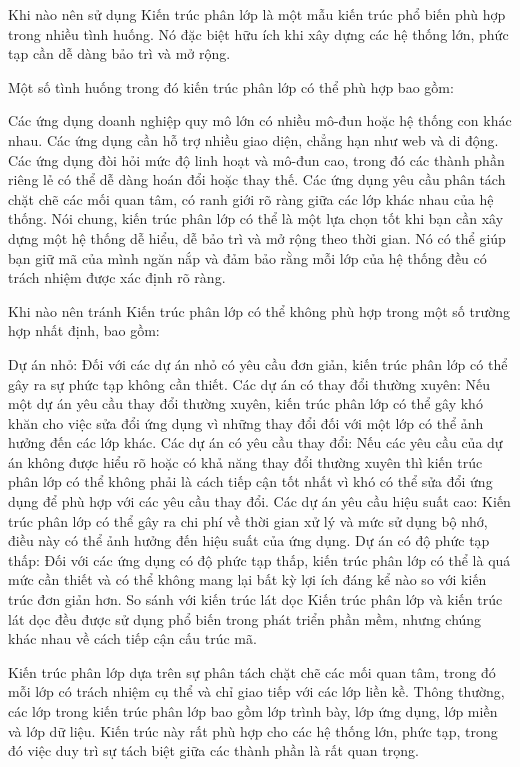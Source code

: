 Khi nào nên sử dụng
Kiến trúc phân lớp là một mẫu kiến ​​trúc phổ biến phù hợp trong nhiều tình huống. Nó đặc biệt hữu ích khi xây dựng các hệ thống lớn, phức tạp cần dễ dàng bảo trì và mở rộng.

Một số tình huống trong đó kiến ​​trúc phân lớp có thể phù hợp bao gồm:

Các ứng dụng doanh nghiệp quy mô lớn có nhiều mô-đun hoặc hệ thống con khác nhau.
Các ứng dụng cần hỗ trợ nhiều giao diện, chẳng hạn như web và di động.
Các ứng dụng đòi hỏi mức độ linh hoạt và mô-đun cao, trong đó các thành phần riêng lẻ có thể dễ dàng hoán đổi hoặc thay thế.
Các ứng dụng yêu cầu phân tách chặt chẽ các mối quan tâm, có ranh giới rõ ràng giữa các lớp khác nhau của hệ thống.
Nói chung, kiến ​​trúc phân lớp có thể là một lựa chọn tốt khi bạn cần xây dựng một hệ thống dễ hiểu, dễ bảo trì và mở rộng theo thời gian. Nó có thể giúp bạn giữ mã của mình ngăn nắp và đảm bảo rằng mỗi lớp của hệ thống đều có trách nhiệm được xác định rõ ràng.

Khi nào nên tránh
Kiến trúc phân lớp có thể không phù hợp trong một số trường hợp nhất định, bao gồm:

Dự án nhỏ: Đối với các dự án nhỏ có yêu cầu đơn giản, kiến ​​trúc phân lớp có thể gây ra sự phức tạp không cần thiết.
Các dự án có thay đổi thường xuyên: Nếu một dự án yêu cầu thay đổi thường xuyên, kiến ​​trúc phân lớp có thể gây khó khăn cho việc sửa đổi ứng dụng vì những thay đổi đối với một lớp có thể ảnh hưởng đến các lớp khác.
Các dự án có yêu cầu thay đổi: Nếu các yêu cầu của dự án không được hiểu rõ hoặc có khả năng thay đổi thường xuyên thì kiến ​​trúc phân lớp có thể không phải là cách tiếp cận tốt nhất vì khó có thể sửa đổi ứng dụng để phù hợp với các yêu cầu thay đổi.
Các dự án yêu cầu hiệu suất cao: Kiến trúc phân lớp có thể gây ra chi phí về thời gian xử lý và mức sử dụng bộ nhớ, điều này có thể ảnh hưởng đến hiệu suất của ứng dụng.
Dự án có độ phức tạp thấp: Đối với các ứng dụng có độ phức tạp thấp, kiến ​​trúc phân lớp có thể là quá mức cần thiết và có thể không mang lại bất kỳ lợi ích đáng kể nào so với kiến ​​trúc đơn giản hơn.
So sánh với kiến ​​trúc lát dọc
Kiến trúc phân lớp và kiến ​​trúc lát dọc đều được sử dụng phổ biến trong phát triển phần mềm, nhưng chúng khác nhau về cách tiếp cận cấu trúc mã.

Kiến trúc phân lớp dựa trên sự phân tách chặt chẽ các mối quan tâm, trong đó mỗi lớp có trách nhiệm cụ thể và chỉ giao tiếp với các lớp liền kề. Thông thường, các lớp trong kiến ​​trúc phân lớp bao gồm lớp trình bày, lớp ứng dụng, lớp miền và lớp dữ liệu. Kiến trúc này rất phù hợp cho các hệ thống lớn, phức tạp, trong đó việc duy trì sự tách biệt giữa các thành phần là rất quan trọng.

